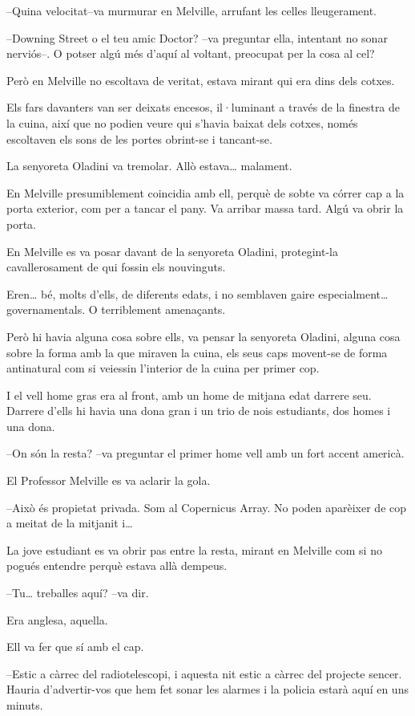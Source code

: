 --Quina velocitat--va murmurar en Melville, arrufant les celles
lleugerament.

--Downing Street o el teu amic Doctor? --va preguntar ella, intentant no
sonar nerviós--. O potser algú més d'aquí al voltant, preocupat per la
cosa al cel?

Però en Melville no escoltava de veritat, estava mirant qui era dins
dels cotxes.

Els fars davanters van ser deixats encesos, il·luminant a través de la
finestra de la cuina, així que no podien veure qui s'havia baixat dels
cotxes, només escoltaven els sons de les portes obrint-se i tancant-se.

La senyoreta Oladini va tremolar. Allò estava\ldots{} malament.

En Melville presumiblement coincidia amb ell, perquè de sobte va córrer
cap a la porta exterior, com per a tancar el pany. Va arribar massa
tard. Algú va obrir la porta.

En Melville es va posar davant de la senyoreta Oladini, protegint-la
cavallerosament de qui fossin els nouvinguts.

Eren\ldots{} bé, molts d'ells, de diferents edats, i no semblaven gaire
especialment\ldots{} governamentals. O terriblement amenaçants.

Però hi havia alguna cosa sobre ells, va pensar la senyoreta Oladini,
alguna cosa sobre la forma amb la que miraven la cuina, els seus caps
movent-se de forma antinatural com si veiessin l'interior de la cuina
per primer cop.

I el vell home gras era al front, amb un home de mitjana edat darrere
seu. Darrere d'ells hi havia una dona gran i un trio de nois estudiants,
dos homes i una dona.

--On són la resta? --va preguntar el primer home vell amb un fort accent
americà.

El Professor Melville es va aclarir la gola.

--Això és propietat privada. Som al Copernicus Array. No poden aparèixer
de cop a meitat de la mitjanit i\ldots{}

La jove estudiant es va obrir pas entre la resta, mirant en Melville com
si no pogués entendre perquè estava allà dempeus.

--Tu\ldots{} treballes aquí? --va dir.

Era anglesa, aquella.

Ell va fer que sí amb el cap.

--Estic a càrrec del radiotelescopi, i aquesta nit estic a càrrec del
projecte sencer. Hauria d'advertir-vos que hem fet sonar les alarmes i
la policia estarà aquí en uns minuts.

